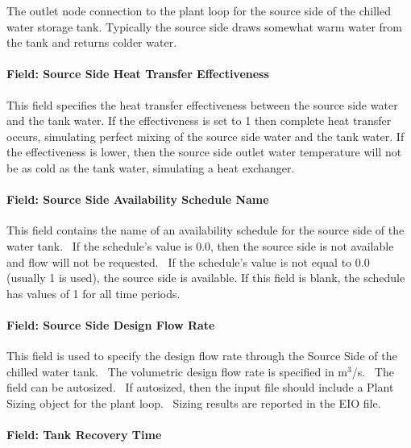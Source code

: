 The outlet node connection to the plant loop for the source side of the chilled water storage tank. Typically the source side draws somewhat warm water from the tank and returns colder water.

\paragraph{Field: Source Side Heat Transfer Effectiveness}\label{field-source-side-heat-transfer-effectiveness}

This field specifies the heat transfer effectiveness between the source side water and the tank water. If the effectiveness is set to 1 then complete heat transfer occurs, simulating perfect mixing of the source side water and the tank water. If the effectiveness is lower, then the source side outlet water temperature will not be as cold as the tank water, simulating a heat exchanger.

\paragraph{Field: Source Side Availability Schedule Name}\label{field-source-side-availability-schedule-name}

This field contains the name of an availability schedule for the source side of the water tank.~ If the schedule's value is 0.0, then the source side is not available and flow will not be requested.~ If the schedule's value is not equal to 0.0 (usually 1 is used), the source side is available. If this field is blank, the schedule has values of 1 for all time periods.

\paragraph{Field: Source Side Design Flow Rate}\label{field-source-side-design-flow-rate}

This field is used to specify the design flow rate through the Source Side of the chilled water tank.~ The volumetric design flow rate is specified in m\(^{3}\)/s.~ The field can be autosized.~ If autosized, then the input file should include a Plant Sizing object for the plant loop.~ Sizing results are reported in the EIO file.

\paragraph{Field: Tank Recovery Time}\label{field-tank-recovery-time}

